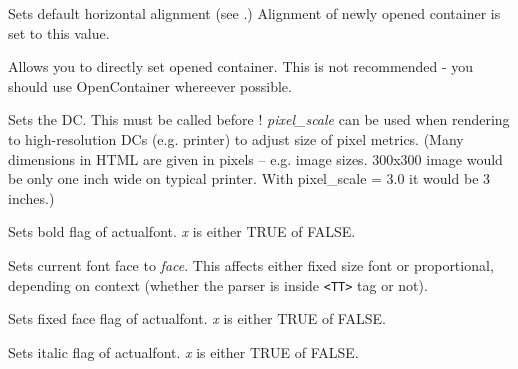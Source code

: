 Sets default horizontal alignment (see
.)
Alignment of newly opened container is set to this value.


\label{wxhtmlwinparsersetcontainer}


Allows you to directly set opened container. This is not recommended - you should use OpenContainer
whereever possible.


\label{wxhtmlwinparsersetdc}


Sets the DC. This must be called before !
{\it pixel\_scale}  can be used when rendering to high-resolution 
DCs (e.g. printer) to adjust size of pixel metrics. (Many dimensions in 
HTML are given in pixels -- e.g. image sizes. 300x300 image would be only one
inch wide on typical printer. With pixel\_scale = 3.0 it would be 3 inches.)


\label{wxhtmlwinparsersetfontbold}


Sets bold flag of actualfont. {\it x} is either TRUE of FALSE.

\label{wxhtmlwinparsersetfontface}


Sets current font face to {\it face}. This affects either fixed size
font or proportional, depending on context (whether the parser is 
inside {\tt <TT>} tag or not).

\label{wxhtmlwinparsersetfontfixed}


Sets fixed face flag of actualfont. {\it x} is either TRUE of FALSE.

\label{wxhtmlwinparsersetfontitalic}


Sets italic flag of actualfont. {\it x} is either TRUE of FALSE.


